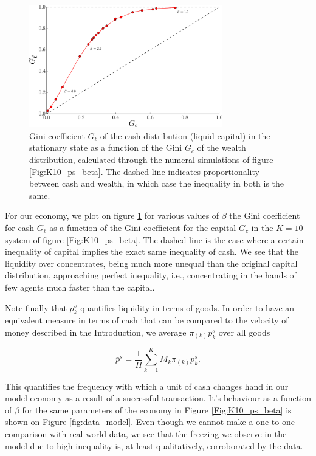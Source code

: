 \begin{figure}[ht]
\centering
\includegraphics[width=0.75\textwidth]{figs_ineq/gini_intro.pdf}
\caption{Gini coefficient $G_\ell$ of the cash distribution (liquid capital) in the stationary state as a function of the Gini $G_c$ of the wealth distribution, calculated through the numeral simulations of figure \ref{Fig:K10_ps_beta}. The dashed line indicates proportionality between cash and wealth, in which case the inequality in both is the same.}
\label{fig:gini}
\end{figure}

For our economy, we plot on figure \ref{fig:gini} for various values of $\beta$ the Gini coefficient for cash $G_\ell$ as a function of the Gini coefficient for the capital $G_c$ in the $K=10$ system of figure \ref{Fig:K10_ps_beta}. The dashed line is the case where a certain inequality of capital implies the exact same inequality of cash. We see that the liquidity over concentrates, being much more unequal than the original capital distribution, approaching perfect inequality, i.e., concentrating in the hands of few agents much faster than the capital.


Note finally that $p^s_k$ quantifies liquidity in terms of goods. In order to have an equivalent measure in terms of cash that can be compared to the velocity of money described in the Introduction, we average $\pi_{(k)} p^s_k$ over all goods

\begin{equation}
\label{def:pavg}
\bar p^s=\frac{1}{\Pi}\sum_{k=1}^K M_k \pi_{(k)} p^s_k.
\end{equation}

This quantifies the frequency with which a unit of cash changes hand in our model economy as a result of a successful transaction. It's behaviour as a function of $\beta$ for the same parameters of the economy in Figure \ref{Fig:K10_ps_beta} is shown on Figure \ref{fig:data_model}. Even though we cannot make a one to one comparison with real world data, we see that the freezing we observe in the model due to high inequality is, at least qualitatively, corroborated by the data.


